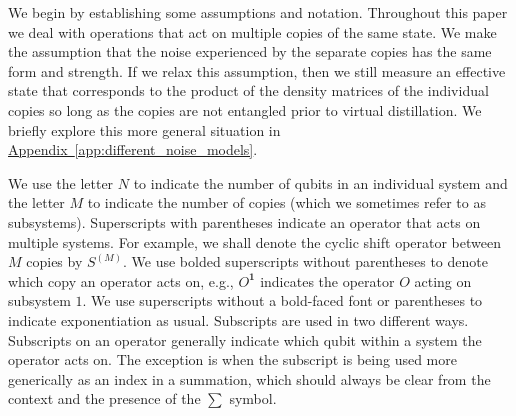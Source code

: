 \documentclass[
amsmath,
amssymb,
aps,
pra,
reprint,
twocolumn,
superscriptaddress,
longbibliography,
showkeys,
floatfix
]{revtex4-1}
\newcommand{\app}[1]{\hyperref[app:#1]{Appendix~\ref*{app:#1}}}
\begin{document}
We begin by establishing some assumptions and notation. 
Throughout this paper we deal with operations that act on multiple copies of the
same state.
We make the assumption that the noise experienced by the separate copies has the
same form and strength. 
If we relax this assumption, then we still measure an effective state that
corresponds to the product of the density matrices of the individual copies so
long as the copies are not entangled prior to virtual distillation. 
We briefly explore this more general situation in \app{different_noise_models}.

We use the letter \(N\) to indicate the number of qubits in an individual system
and the letter \(M\) to indicate the number of copies (which we sometimes refer
to as subsystems).
Superscripts with parentheses indicate an operator that acts on multiple
systems. 
For example, we shall denote the cyclic shift operator between \(M\) copies by
\(S^{(M)}\).
We use bolded superscripts without parentheses to denote which copy an operator
acts on, e.g., \(O^\textbf{1}\) indicates the operator \(O\) acting on subsystem
\(1\).
We use superscripts without a bold-faced font or parentheses to indicate
exponentiation as usual.
Subscripts are used in two different ways. 
Subscripts on an operator generally indicate which qubit within a system the
operator acts on. 
The exception is when the subscript is being used more generically as an index
in a summation, which should always be clear from the context and the presence
of the \(\sum\) symbol.
\end{document}
